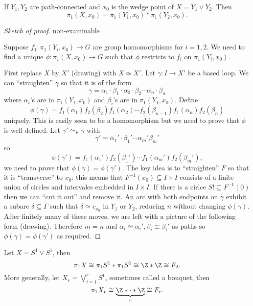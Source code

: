 \documentclass[a4paper]{article}
\newcommand{\w}{\vee}
\begin{document}
\begin{theorem}
  If \(Y_1, Y_2\) are path-connected and \(x_0\) is the wedge point of \(X = Y_1 \w Y_2\). Then
  \[
    \pi_1(X, x_0) = \pi_1(Y_1, x_0) * \pi_1(Y_2, x_0).
  \]
\end{theorem}

\begin{proof}[Sketch of proof]
  non-examinable

  Suppose \(f_1: \pi_1(Y_i, x_0) \to G\) are group homomorphisms for \(i = 1, 2\). We need to find a unique \(\phi: \pi_1(X, x_0) \to G\) such that \(\phi\) restricts to \(f_i\) on \(\pi_1(Y_i, x_0)\).

  First replace \(X\) by \(X'\) (drawing) with \(X \simeq X'\). Let \(\gamma: I \to X'\) be a based loop. We can ``straighten'' \(\gamma\) so that it is of the form
  \[
    \gamma = \alpha_1 \cdot \beta_1 \cdot \alpha_2 \cdot \beta_2 \cdots \alpha_n \cdot \beta_n
  \]
  where \(\alpha_i\)'s are in \(\pi_1(Y_1, x_0)\) and \(\beta_i\)'s are in \(\pi_1(Y_1, x_0)\). Define
  \[
    \phi(\gamma) = f_1(\alpha_1) f_2(\beta_2) f_1(\alpha_2) \cdots f_2(\beta_{n - 1}) f_1(\alpha_n) f_2(\beta_n)
  \]
  uniquely. This is easily seen to be a homomorphism but we need to prove that \(\phi\) is well-defined. Let \(\gamma' \simeq_F \gamma\) with
  \[
    \gamma' = \alpha_1' \cdot \beta_1' \cdots \alpha_m' \beta_m'
  \]
  so
  \[
    \phi(\gamma') = f_1(\alpha_1')f_2(\beta_1') \cdots f_1(\alpha_m') f_2(\beta_m'),
  \]
  we need to prove that \(\phi(\gamma) = \phi(\gamma')\). The key idea is to ``straighten'' \(F\) so that it is ``transverse'' to \(x_0\): this means that \(F^{-1}(x_0) \subseteq I \times I\) consists of a finite union of circles and intervales embedded in \(I \times I\). If there is a cirlce \(S! \subseteq F^{-1}(0)\) then we can ``cut it out'' and remove it. An arc with both endpoints on \(\gamma\) exhibit a subarc \(\delta \subseteq \Gamma\) such that \(\delta \simeq c_{x_0}\) in \(Y_1\) or \(Y_2\), reducing \(n\) without changing \(\phi(\gamma)\). After finitely many of these moves, we are left with a picture of the following form (drawing). Therefore \(m = n\) and \(\alpha_i \simeq \alpha_i', \beta_i \cong \beta_i'\) as paths so \(\phi(\gamma) = \phi(\gamma')\) as required.
\end{proof}

\begin{eg}
  Let \(X = S^1 \w S^1\), then
  \[
    \pi_1 X \cong \pi_1S^1 * \pi_1S^1 \cong \Z * \Z \cong F_2.
  \]
  More generally, let \(X_r = \bigvee_{i = 1}^r S^1\), sometimes called a bouquet, then
  \[
    \pi_1 X_r \cong \underbrace{\Z * \cdot * \Z}_{r} \cong F_r.
  \]
\end{eg}
\end{document}
